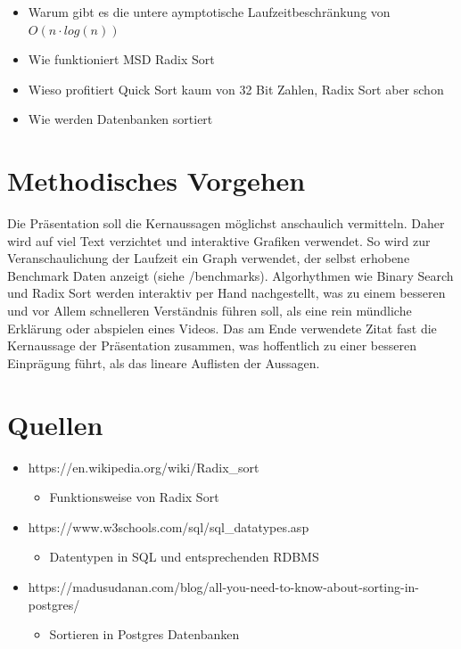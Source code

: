 \documentclass[a4paper, 12pt, oneside]{article}
\begin{document}
    \begin{itemize}
        \item Warum gibt es die untere aymptotische Laufzeitbeschränkung von $O(n \cdot log(n))$
        \item Wie funktioniert MSD Radix Sort 
        \item Wieso profitiert Quick Sort kaum von 32 Bit Zahlen, Radix Sort aber schon
        \item Wie werden Datenbanken sortiert
    \end{itemize}


    \section{Methodisches Vorgehen}

    Die Präsentation soll die Kernaussagen möglichst anschaulich vermitteln. 
    Daher wird auf viel Text verzichtet und interaktive Grafiken verwendet.
    So wird zur Veranschaulichung der Laufzeit ein Graph verwendet, der selbst 
    erhobene Benchmark Daten anzeigt (siehe /benchmarks). 
    Algorhythmen wie Binary Search und Radix Sort werden interaktiv per Hand 
    nachgestellt, was zu einem besseren und vor Allem schnelleren Verständnis
    führen soll, als eine rein mündliche Erklärung oder abspielen eines Videos. 
    Das am Ende verwendete Zitat fast die Kernaussage der Präsentation zusammen, was 
    hoffentlich zu einer besseren Einprägung führt, als das lineare 
    Auflisten der Aussagen.


    \clearpage
    \section{Quellen}

    \begin{itemize}
        \item https://en.wikipedia.org/wiki/Radix\_sort
        \begin{itemize}
            \item Funktionsweise von Radix Sort
        \end{itemize}
        \item https://www.w3schools.com/sql/sql\_datatypes.asp
        \begin{itemize}
            \item Datentypen in SQL und entsprechenden RDBMS
        \end{itemize}
        \item https://madusudanan.com/blog/all-you-need-to-know-about-sorting-in-postgres/
        \begin{itemize}
            \item Sortieren in Postgres Datenbanken 
        \end{itemize}
    \end{itemize}
\end{document}
